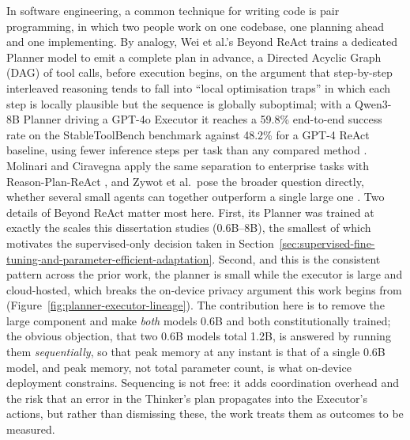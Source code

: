 In software engineering, a common technique for writing code is pair programming, in which two people work on one codebase, one planning ahead and one implementing. By analogy, Wei et al.'s Beyond ReAct trains a dedicated Planner model to emit a complete plan in advance, a Directed Acyclic Graph (DAG) of tool calls, before execution begins, on the argument that step-by-step interleaved reasoning tends to fall into ``local optimisation traps'' in which each step is locally plausible but the sequence is globally suboptimal; with a Qwen3-8B Planner driving a GPT-4o Executor it reaches a 59.8\% end-to-end success rate on the StableToolBench benchmark against 48.2\% for a GPT-4 ReAct baseline, using fewer inference steps per task than any compared method \cite{wei2025reactplannercentricframeworkcomplex}. Molinari and Ciravegna apply the same separation to enterprise tasks with Reason-Plan-ReAct \cite{molinari2025reasonplanreactreasonerplannersupervisingreact}, and Zywot et al.\ pose the broader question directly, whether several small agents can together outperform a single large one \cite{zywot2026smallagentscollaboratebeat}. Two details of Beyond ReAct matter most here. First, its Planner was trained at exactly the scales this dissertation studies (0.6B--8B), the smallest of which motivates the supervised-only decision taken in Section~\ref{sec:supervised-fine-tuning-and-parameter-efficient-adaptation}. Second, and this is the consistent pattern across the prior work, the planner is small while the executor is large and cloud-hosted, which breaks the on-device privacy argument this work begins from (Figure~\ref{fig:planner-executor-lineage}). The contribution here is to remove the large component and make \emph{both} models 0.6B and both constitutionally trained; the obvious objection, that two 0.6B models total 1.2B, is answered by running them \emph{sequentially}, so that peak memory at any instant is that of a single 0.6B model, and peak memory, not total parameter count, is what on-device deployment constrains. Sequencing is not free: it adds coordination overhead and the risk that an error in the Thinker's plan propagates into the Executor's actions, but rather than dismissing these, the work treats them as outcomes to be measured.

